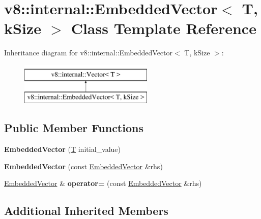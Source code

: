 \hypertarget{classv8_1_1internal_1_1EmbeddedVector}{}\section{v8\+:\+:internal\+:\+:Embedded\+Vector$<$ T, k\+Size $>$ Class Template Reference}
\label{classv8_1_1internal_1_1EmbeddedVector}
Inheritance diagram for v8\+:\+:internal\+:\+:Embedded\+Vector$<$ T, k\+Size $>$\+:\begin{figure}[H]
\begin{center}
\leavevmode
\includegraphics[height=2.000000cm]{classv8_1_1internal_1_1EmbeddedVector}
\end{center}
\end{figure}
\subsection*{Public Member Functions}
\begin{DoxyCompactItemize}
\item 
\mbox{\label{classv8_1_1internal_1_1EmbeddedVector_a083ff24cfe7d3a2d079045eb8818fbdd}} 
{\bfseries Embedded\+Vector} (\mbox{\hyperlink{classv8_1_1internal_1_1torque_1_1T}{T}} initial\+\_\+value)
\item 
\mbox{\label{classv8_1_1internal_1_1EmbeddedVector_a4060b1a3ad19ff94e059bc0e7916fc05}} 
{\bfseries Embedded\+Vector} (const \mbox{\hyperlink{classv8_1_1internal_1_1EmbeddedVector}{Embedded\+Vector}} \&rhs)
\item 
\mbox{\label{classv8_1_1internal_1_1EmbeddedVector_a5f6d10806a8caa0f6876ee09ca23f0e7}} 
\mbox{\hyperlink{classv8_1_1internal_1_1EmbeddedVector}{Embedded\+Vector}} \& {\bfseries operator=} (const \mbox{\hyperlink{classv8_1_1internal_1_1EmbeddedVector}{Embedded\+Vector}} \&rhs)
\end{DoxyCompactItemize}
\subsection*{Additional Inherited Members}


